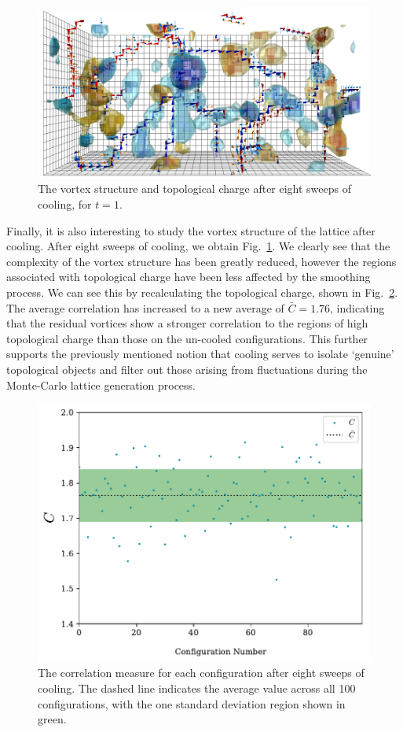 \begin{figure}[H]
\centering
\includegraphics[width=\linewidth]{./PlaqLinkTopQ_CFG95_T01_8SW.png}
\caption{\label{fig:PlaqLinkTopQ_SW8}The vortex structure and topological charge after eight sweeps of cooling, for $t=1$.}
\end{figure}
%

Finally, it is also interesting to study the vortex structure of the lattice after cooling. After eight sweeps of cooling, we obtain Fig.~\ref{fig:PlaqLinkTopQ_SW8}. We clearly see that the complexity of the vortex structure has been greatly reduced, however the regions associated with topological charge have been less affected by the smoothing process. We can see this by recalculating the topological charge, shown in Fig.~\ref{fig:Correlation_sw07}. The average correlation has increased to a new average of $\bar{C}=1.76$, indicating that the residual vortices show a stronger correlation to the regions of high topological charge than those on the un-cooled configurations. This further supports the previously mentioned notion that cooling serves to isolate `genuine' topological objects and filter out those arising from fluctuations during the Monte-Carlo lattice generation process.
%

\begin{figure}[H]
\centering
\includegraphics[width=0.8\linewidth]{./Correlation_sw07.pdf}
\caption[The correlation measure for each configuration after eight sweeps of cooling.]{\label{fig:Correlation_sw07}The correlation measure for each configuration after eight sweeps of cooling. The dashed line indicates the average value across all 100 configurations, with the one standard deviation region shown in green.}
\end{figure}

